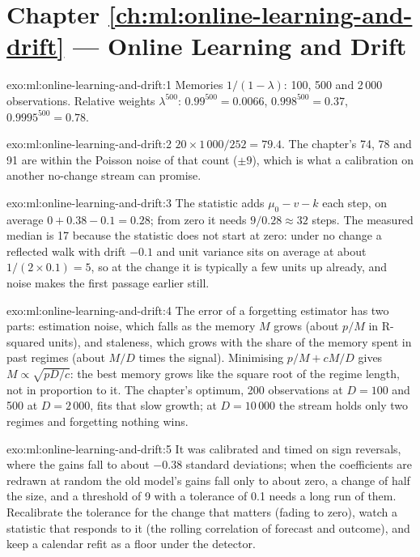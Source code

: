 \section*{Chapter \ref{ch:ml:online-learning-and-drift} --- Online Learning and Drift}

\begin{solution}{exo:ml:online-learning-and-drift:1}
Memories $1/(1-\lambda)$: 100, 500 and 2\,000 observations. Relative weights $\lambda^{500}$: $0.99^{500} = 0.0066$,
$0.998^{500} = 0.37$, $0.9995^{500} = 0.78$.
\end{solution}

\begin{solution}{exo:ml:online-learning-and-drift:2}
$20\times1\,000/252 = 79.4$. The chapter's 74, 78 and 91 are within the Poisson noise of that count ($\pm9$), which is
what a calibration on another no-change stream can promise.
\end{solution}

\begin{solution}{exo:ml:online-learning-and-drift:3}
The statistic adds $\mu_0 - v - k$ each step, on average $0 + 0.38 - 0.1 = 0.28$; from zero it needs $9/0.28\approx32$
steps. The measured median is 17 because the statistic does not start at zero: under no change a reflected walk with
drift $-0.1$ and unit variance sits on average at about $1/(2\times0.1) = 5$, so at the change it is typically a few units
up already, and noise makes the first passage earlier still.
\end{solution}

\begin{solution}{exo:ml:online-learning-and-drift:4}
The error of a forgetting estimator has two parts: estimation noise, which falls as the memory $M$ grows (about $p/M$ in
R-squared units), and staleness, which grows with the share of the memory spent in past regimes (about $M/D$ times the
signal). Minimising $p/M + cM/D$ gives $M\propto\sqrt{pD/c}$: the best memory grows like the square root of the regime
length, not in proportion to it. The chapter's optimum, 200 observations at $D = 100$ and 500 at $D = 2\,000$, fits that
slow growth; at $D = 10\,000$ the stream holds only two regimes and forgetting nothing wins.
\end{solution}

\begin{solution}{exo:ml:online-learning-and-drift:5}
It was calibrated and timed on sign reversals, where the gains fall to about $-0.38$ standard deviations; when the
coefficients are redrawn at random the old model's gains fall only to about zero, a change of half the size, and a
threshold of 9 with a tolerance of 0.1 needs a long run of them. Recalibrate the tolerance for the change that matters
(fading to zero), watch a statistic that responds to it (the rolling correlation of forecast and outcome), and keep a
calendar refit as a floor under the detector.
\end{solution}

